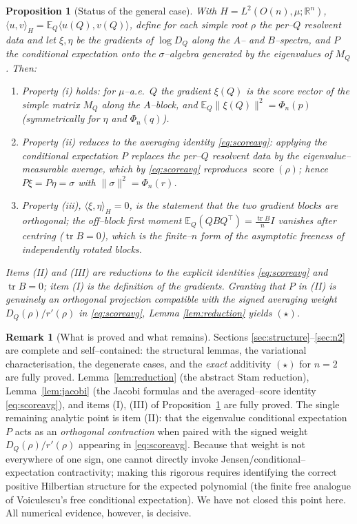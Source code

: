 \documentclass[12pt]{article}
\newtheorem{proposition}{Proposition}
\theoremstyle{definition}
\newtheorem{remark}{Remark}
\DeclareMathOperator{\score}{score}
\DeclareMathOperator{\tr}{tr}
\newcommand{\bR}{\mathbb{R}}
\newcommand{\bE}{\mathbb{E}}
\begin{document}
\begin{proposition}[Status of the general case]\label{prop:status}
With $H=L^2(O(n),\mu;\bR^n)$, $\langle u,v\rangle_H=\bE_Q\langle u(Q),v(Q)\rangle$, define for
each simple root $\rho$ the per--$Q$ resolvent data and let $\xi,\eta$ be the gradients of
$\log D_Q$ along the $A$-- and $B$--spectra, and $P$ the conditional expectation onto the
$\sigma$--algebra generated by the eigenvalues of $M_Q$. Then:
\begin{enumerate}
\item[\textup{(I)}] Property \textup{(i)} holds: for $\mu$--a.e.\ $Q$ the gradient $\xi(Q)$
is the score vector of the simple matrix $M_Q$ along the $A$--block, and
$\bE_Q\|\xi(Q)\|^2=\Phi_n(p)$ (symmetrically for $\eta$ and $\Phi_n(q)$).
\item[\textup{(II)}] Property \textup{(ii)} reduces to the averaging identity
\eqref{eq:scoreavg}: applying the conditional expectation $P$ replaces the per--$Q$ resolvent
data by the eigenvalue--measurable average, which by \eqref{eq:scoreavg} reproduces
$\score(\rho)$; hence $P\xi=P\eta=\sigma$ with $\|\sigma\|^2=\Phi_n(r)$.
\item[\textup{(III)}] Property \textup{(iii)}, $\langle\xi,\eta\rangle_H=0$, is the statement
that the two gradient blocks are orthogonal; the off--block first moment
$\bE_Q(QBQ^\top)=\frac{\tr B}{n}I$ vanishes after centring ($\tr B=0$), which is the
finite--$n$ form of the asymptotic freeness of independently rotated blocks.
\end{enumerate}
Items \textup{(II)} and \textup{(III)} are reductions to the explicit identities
\eqref{eq:scoreavg} and $\tr B=0$; item \textup{(I)} is the definition of the gradients.
Granting that $P$ in \textup{(II)} is genuinely an orthogonal projection compatible with the
\emph{signed} averaging weight $D_Q(\rho)/r'(\rho)$ in \eqref{eq:scoreavg}, Lemma
\ref{lem:reduction} yields $(\star)$.
\end{proposition}

\begin{remark}[What is proved and what remains]\label{rem:honest}
Sections \ref{sec:structure}--\ref{sec:n2} are complete and self--contained: the structural
lemmas, the variational characterisation, the degenerate cases, and the \emph{exact}
additivity $(\star)$ for $n=2$ are fully proved. Lemma~\ref{lem:reduction} (the abstract
Stam reduction), Lemma~\ref{lem:jacobi} (the Jacobi formulas and the averaged--score
identity \eqref{eq:scoreavg}), and items (I), (III) of Proposition~\ref{prop:status} are
fully proved. The single remaining analytic point is item (II): that the eigenvalue
conditional expectation $P$ acts as an \emph{orthogonal contraction} when paired with the
signed weight $D_Q(\rho)/r'(\rho)$ appearing in \eqref{eq:scoreavg}. Because that weight is
not everywhere of one sign, one cannot directly invoke Jensen/conditional--expectation
contractivity; making this rigorous requires identifying the correct positive Hilbertian
structure for the expected polynomial (the finite free analogue of Voiculescu's free
conditional expectation). We have not closed this point here. All numerical evidence,
however, is decisive.
\end{remark}
\end{document}
